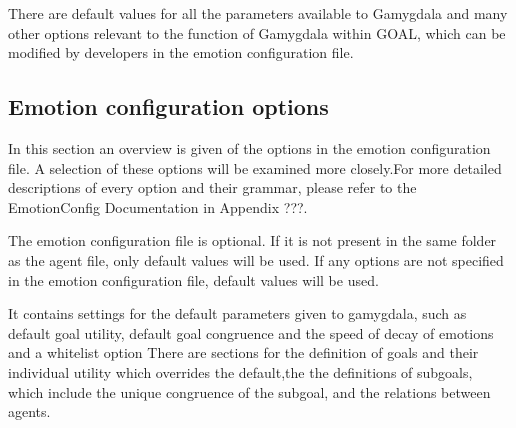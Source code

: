 \documentclass[]{article}
\begin{document}
There are default values for all the parameters available to Gamygdala and many other options relevant to the function of Gamygdala within GOAL, which can be modified by developers in the emotion configuration file.


\subsection{Emotion configuration options}
In this section an overview is given of the options in the emotion configuration file. A selection of these options will be examined more closely.For more detailed descriptions of every option and their grammar, please refer to the EmotionConfig Documentation in Appendix ???. 

The emotion configuration file is optional. If it is not present in the same folder as the agent file, only default values will be used. If any options are not specified in the emotion configuration file, default values will be used.

It contains settings for the default parameters given to gamygdala, such as default goal utility, default goal congruence and the speed of decay of emotions and a whitelist option There are sections for the definition of goals and their individual utility which overrides the default,the the definitions of subgoals, which include the unique congruence of the subgoal, and the relations between agents.
\end{document}
